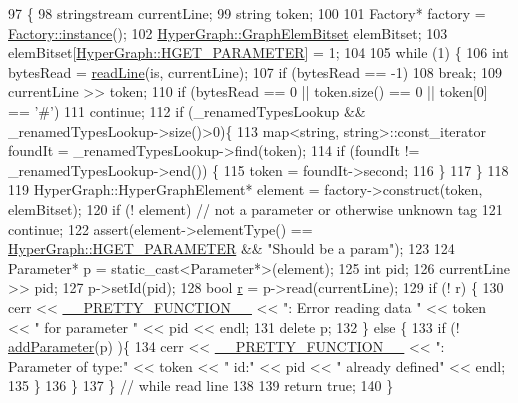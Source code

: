 \begin{DoxyCode}
97                                                                                                       \{
98     stringstream currentLine;
99     \textcolor{keywordtype}{string} token;
100 
101     Factory* factory = \hyperlink{classg2o_1_1Factory_a8a1f33e017c5ad59399cef48972578ae}{Factory::instance}();
102     \hyperlink{classg2o_1_1HyperGraph_a7b8fda20e1b03e92aeceeac6e8218b73}{HyperGraph::GraphElemBitset} elemBitset;
103     elemBitset[\hyperlink{classg2o_1_1HyperGraph_af603119d5d3475aed6e34ee9d701b69eaec8dd0de424ff24a18d3ba5ed3864f79}{HyperGraph::HGET\_PARAMETER}] = 1;
104     
105     \textcolor{keywordflow}{while} (1) \{
106       \textcolor{keywordtype}{int} bytesRead = \hyperlink{group__utils_ga07aa1d8e5a4e25d0170010df66908611}{readLine}(is, currentLine);
107       \textcolor{keywordflow}{if} (bytesRead == -1)
108         \textcolor{keywordflow}{break};
109       currentLine >> token;
110       \textcolor{keywordflow}{if} (bytesRead == 0 || token.size() == 0 || token[0] == \textcolor{charliteral}{'#'})
111         \textcolor{keywordflow}{continue};
112       \textcolor{keywordflow}{if} (\_renamedTypesLookup && \_renamedTypesLookup->size()>0)\{
113         map<string, string>::const\_iterator foundIt = \_renamedTypesLookup->find(token);
114         \textcolor{keywordflow}{if} (foundIt != \_renamedTypesLookup->end()) \{
115           token = foundIt->second;
116         \}
117       \}
118 
119       HyperGraph::HyperGraphElement* element = factory->construct(token, elemBitset);
120       \textcolor{keywordflow}{if} (! element) \textcolor{comment}{// not a parameter or otherwise unknown tag}
121         \textcolor{keywordflow}{continue};
122       assert(element->elementType() == \hyperlink{classg2o_1_1HyperGraph_af603119d5d3475aed6e34ee9d701b69eaec8dd0de424ff24a18d3ba5ed3864f79}{HyperGraph::HGET\_PARAMETER} && \textcolor{stringliteral}{"Should be a
       param"});
123 
124       Parameter* p = \textcolor{keyword}{static\_cast<}Parameter*\textcolor{keyword}{>}(element);
125       \textcolor{keywordtype}{int} pid;
126       currentLine >> pid;
127       p->setId(pid);
128       \textcolor{keywordtype}{bool} \hyperlink{sparse__block__matrix_8hpp_acab531abaa74a7e664e3986f2522b33a}{r} = p->read(currentLine);
129       \textcolor{keywordflow}{if} (! r) \{
130         cerr << \hyperlink{macros_8h_a9c15fe1e91b07ea3280f5239f9841b67}{\_\_PRETTY\_FUNCTION\_\_} << \textcolor{stringliteral}{": Error reading data "} << token << \textcolor{stringliteral}{" for
       parameter "} << pid << endl;
131         \textcolor{keyword}{delete} p;
132       \} \textcolor{keywordflow}{else} \{
133         \textcolor{keywordflow}{if} (! \hyperlink{classg2o_1_1ParameterContainer_a9c0b1376e780b177f2d36c4ee4f873d7}{addParameter}(p) )\{
134           cerr << \hyperlink{macros_8h_a9c15fe1e91b07ea3280f5239f9841b67}{\_\_PRETTY\_FUNCTION\_\_} << \textcolor{stringliteral}{": Parameter of type:"} << token << \textcolor{stringliteral}{" id:"} << 
      pid << \textcolor{stringliteral}{" already defined"} << endl;
135         \}
136       \}
137     \} \textcolor{comment}{// while read line}
138     
139     \textcolor{keywordflow}{return} \textcolor{keyword}{true};
140   \}
\end{DoxyCode}
